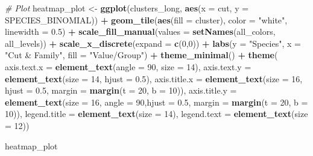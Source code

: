 \documentclass[
]{article}
\newenvironment{Shaded}{\begin{snugshade}}{\end{snugshade}}
\newcommand{\AttributeTok}[1]{\textcolor[rgb]{0.13,0.29,0.53}{#1}}
\newcommand{\CommentTok}[1]{\textcolor[rgb]{0.56,0.35,0.01}{\textit{#1}}}
\newcommand{\DecValTok}[1]{\textcolor[rgb]{0.00,0.00,0.81}{#1}}
\newcommand{\FloatTok}[1]{\textcolor[rgb]{0.00,0.00,0.81}{#1}}
\newcommand{\FunctionTok}[1]{\textcolor[rgb]{0.13,0.29,0.53}{\textbf{#1}}}
\newcommand{\NormalTok}[1]{#1}
\newcommand{\OtherTok}[1]{\textcolor[rgb]{0.56,0.35,0.01}{#1}}
\newcommand{\SpecialCharTok}[1]{\textcolor[rgb]{0.81,0.36,0.00}{\textbf{#1}}}
\newcommand{\StringTok}[1]{\textcolor[rgb]{0.31,0.60,0.02}{#1}}
\begin{document}
\begin{Shaded}
\begin{Highlighting}[]
\CommentTok{\# Plot}
\NormalTok{heatmap\_plot }\OtherTok{\textless{}{-}} \FunctionTok{ggplot}\NormalTok{(clusters\_long, }\FunctionTok{aes}\NormalTok{(}\AttributeTok{x =}\NormalTok{ cut, }\AttributeTok{y =}\NormalTok{ SPECIES\_BINOMIAL)) }\SpecialCharTok{+}
  \FunctionTok{geom\_tile}\NormalTok{(}\FunctionTok{aes}\NormalTok{(}\AttributeTok{fill =}\NormalTok{ cluster), }\AttributeTok{color =} \StringTok{"white"}\NormalTok{, }\AttributeTok{linewidth =} \FloatTok{0.5}\NormalTok{) }\SpecialCharTok{+}
  \FunctionTok{scale\_fill\_manual}\NormalTok{(}\AttributeTok{values =} \FunctionTok{setNames}\NormalTok{(all\_colors, all\_levels)) }\SpecialCharTok{+}
  \FunctionTok{scale\_x\_discrete}\NormalTok{(}\AttributeTok{expand =} \FunctionTok{c}\NormalTok{(}\DecValTok{0}\NormalTok{,}\DecValTok{0}\NormalTok{)) }\SpecialCharTok{+}
  \FunctionTok{labs}\NormalTok{(}\AttributeTok{y =} \StringTok{"Species"}\NormalTok{, }\AttributeTok{x =} \StringTok{"Cut \& Family"}\NormalTok{, }\AttributeTok{fill =} \StringTok{"Value/Group"}\NormalTok{) }\SpecialCharTok{+}
  \FunctionTok{theme\_minimal}\NormalTok{() }\SpecialCharTok{+}
  \FunctionTok{theme}\NormalTok{(}
    \AttributeTok{axis.text.x =} \FunctionTok{element\_text}\NormalTok{(}\AttributeTok{angle =} \DecValTok{90}\NormalTok{, }\AttributeTok{size =} \DecValTok{14}\NormalTok{),}
    \AttributeTok{axis.text.y =} \FunctionTok{element\_text}\NormalTok{(}\AttributeTok{size =} \DecValTok{14}\NormalTok{, }\AttributeTok{hjust =} \FloatTok{0.5}\NormalTok{),}
    \AttributeTok{axis.title.x =} \FunctionTok{element\_text}\NormalTok{(}\AttributeTok{size =} \DecValTok{16}\NormalTok{, }\AttributeTok{hjust =} \FloatTok{0.5}\NormalTok{, }\AttributeTok{margin =} \FunctionTok{margin}\NormalTok{(}\AttributeTok{t =} \DecValTok{20}\NormalTok{, }\AttributeTok{b =} \DecValTok{10}\NormalTok{)),}
    \AttributeTok{axis.title.y =} \FunctionTok{element\_text}\NormalTok{(}\AttributeTok{size =} \DecValTok{16}\NormalTok{, }\AttributeTok{angle =} \DecValTok{90}\NormalTok{,}\AttributeTok{hjust =} \FloatTok{0.5}\NormalTok{, }\AttributeTok{margin =} \FunctionTok{margin}\NormalTok{(}\AttributeTok{t =} \DecValTok{20}\NormalTok{, }\AttributeTok{b =} \DecValTok{10}\NormalTok{)),}
    \AttributeTok{legend.title =} \FunctionTok{element\_text}\NormalTok{(}\AttributeTok{size =} \DecValTok{14}\NormalTok{),}
    \AttributeTok{legend.text =} \FunctionTok{element\_text}\NormalTok{(}\AttributeTok{size =} \DecValTok{12}\NormalTok{))}
    
\NormalTok{heatmap\_plot}
\end{Highlighting}
\end{Shaded}
\end{document}
